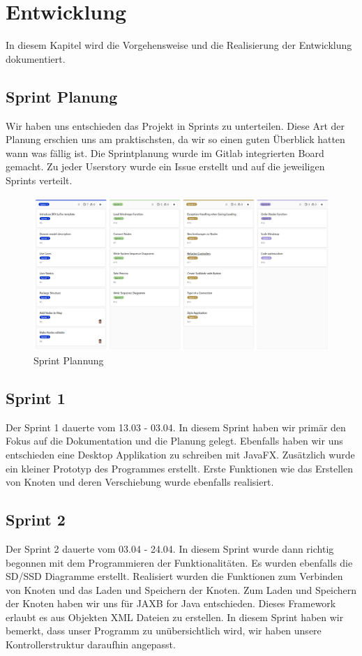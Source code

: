\chapter{Entwicklung}
\label{chap:entwicklung}
In diesem Kapitel wird die Vorgehensweise und die Realisierung der Entwicklung dokumentiert.
\section{Sprint Planung}
\label{sec:sprintplanung}
Wir haben uns entschieden das Projekt in Sprints zu unterteilen. Diese Art der Planung erschien uns am praktischsten, da wir so einen guten Überblick hatten wann was fällig ist. Die Sprintplanung wurde im Gitlab integrierten Board gemacht. Zu jeder Userstory wurde ein Issue erstellt und auf die jeweiligen Sprints verteilt.
\begin{figure}[H]
	\centering
		\includegraphics[width=\textwidth]{images/Board.PNG}
	\caption{Sprint Plannung}
	\label{fig:sprint_plannung}
\end{figure}

\section{Sprint 1}
\label{sec:sprint_1}
Der Sprint 1 dauerte vom 13.03 - 03.04. In diesem Sprint haben wir primär den Fokus auf die Dokumentation und die Planung gelegt. Ebenfalls haben wir uns entschieden eine Desktop Applikation zu schreiben mit JavaFX. Zusätzlich wurde ein kleiner Prototyp des Programmes erstellt. Erste Funktionen wie das Erstellen von Knoten und deren Verschiebung wurde ebenfalls realisiert.
\section{Sprint 2}
\label{sec:sprint_2}
Der Sprint 2 dauerte vom 03.04 - 24.04. In diesem Sprint wurde dann richtig begonnen mit dem Programmieren der Funktionalitäten. Es wurden ebenfalls die SD/SSD Diagramme erstellt. Realisiert wurden die Funktionen zum Verbinden von Knoten und das Laden und Speichern der Knoten. Zum Laden und Speichern der Knoten haben wir uns für JAXB for Java entschieden. Dieses Framework erlaubt es aus Objekten XML Dateien zu erstellen.
In diesem Sprint haben wir bemerkt, dass unser Programm zu unübersichtlich wird, wir haben unsere Kontrollerstruktur daraufhin angepasst.
